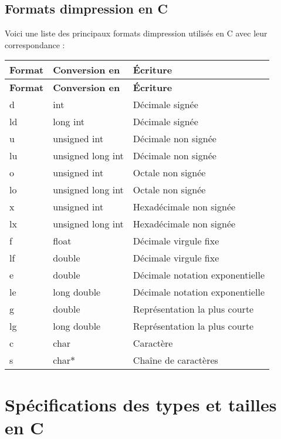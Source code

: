 \subsection*{Formats d\textquotesingle{}impression en C}

Voici une liste des principaux formats d\textquotesingle{}impression utilisés en C avec leur correspondance \+:

\tabulinesep=1mm
\begin{longtabu} spread 0pt [c]{*{3}{|X[-1]}|}
\hline
\rowcolor{\tableheadbgcolor}\textbf{ Format }&\textbf{ Conversion en }&\textbf{ Écriture  }\\
\endfirsthead
\hline
\endfoot
\hline
\rowcolor{\tableheadbgcolor}\textbf{ Format }&\textbf{ Conversion en }&\textbf{ Écriture  }\\
\endhead
d &int &Décimale signée \\
ld &long int &Décimale signée \\
u &unsigned int &Décimale non signée \\
lu &unsigned long int &Décimale non signée \\
o &unsigned int &Octale non signée \\
lo &unsigned long int &Octale non signée \\
x &unsigned int &Hexadécimale non signée \\
lx &unsigned long int &Hexadécimale non signée \\
f &float &Décimale virgule fixe \\
lf &double &Décimale virgule fixe \\
e &double &Décimale notation exponentielle \\
le &long double &Décimale notation exponentielle \\
g &double &Représentation la plus courte \\
lg &long double &Représentation la plus courte \\
c &char &Caractère \\
s &char$\ast$ &Chaîne de caractères \\
\end{longtabu}
\section*{Spécifications des types et tailles en C}


